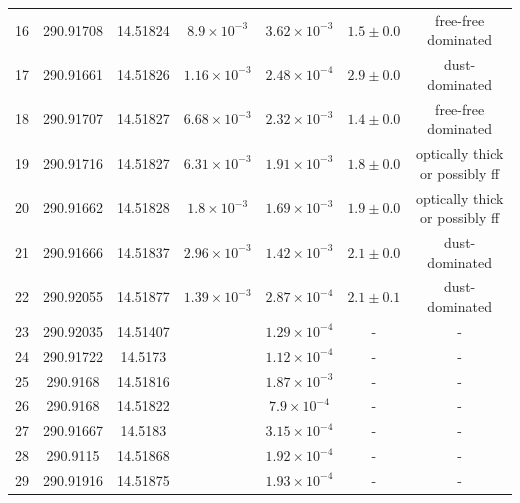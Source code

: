 \begin{table}
\begin{tabular}{ccccccc}
16 & 290.91708 & 14.51824 & $8.9\times10^{-3}$ & $3.62\times10^{-3}$ & $1.5\pm0.0$ & free-free dominated \\
17 & 290.91661 & 14.51826 & $1.16\times10^{-3}$ & $2.48\times10^{-4}$ & $2.9\pm0.0$ & dust-dominated \\
18 & 290.91707 & 14.51827 & $6.68\times10^{-3}$ & $2.32\times10^{-3}$ & $1.4\pm0.0$ & free-free dominated \\
19 & 290.91716 & 14.51827 & $6.31\times10^{-3}$ & $1.91\times10^{-3}$ & $1.8\pm0.0$ & optically thick or possibly ff \\
20 & 290.91662 & 14.51828 & $1.8\times10^{-3}$ & $1.69\times10^{-3}$ & $1.9\pm0.0$ & optically thick or possibly ff \\
21 & 290.91666 & 14.51837 & $2.96\times10^{-3}$ & $1.42\times10^{-3}$ & $2.1\pm0.0$ & dust-dominated \\
22 & 290.92055 & 14.51877 & $1.39\times10^{-3}$ & $2.87\times10^{-4}$ & $2.1\pm0.1$ & dust-dominated \\
23 & 290.92035 & 14.51407 &  & $1.29\times10^{-4}$ & - & - \\
24 & 290.91722 & 14.5173 &  & $1.12\times10^{-4}$ & - & - \\
25 & 290.9168 & 14.51816 &  & $1.87\times10^{-3}$ & - & - \\
26 & 290.9168 & 14.51822 &  & $7.9\times10^{-4}$ & - & - \\
27 & 290.91667 & 14.5183 &  & $3.15\times10^{-4}$ & - & - \\
28 & 290.9115 & 14.51868 &  & $1.92\times10^{-4}$ & - & - \\
29 & 290.91916 & 14.51875 &  & $1.93\times10^{-4}$ & - & - \\
\end{tabular}
\end{table}
